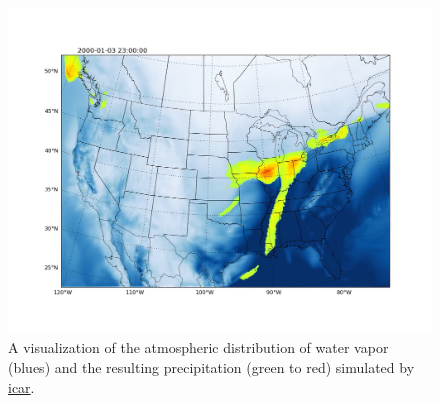 \begin{figure}
   \vspace{-18pt}
   \vbox{\hspace{-24pt}
   \includegraphics[width=1.1\columnwidth]{figures/icar/frames/frame22.png}
   }
   \vspace{-24pt}
   \caption{A visualization of the atmospheric distribution of water vapor (blues) and the resulting precipitation (green to red) simulated by \href{https://github.com/gutmann/icar}{\gls{icar}}.%
\label{figure:icar}}
\end{figure}

